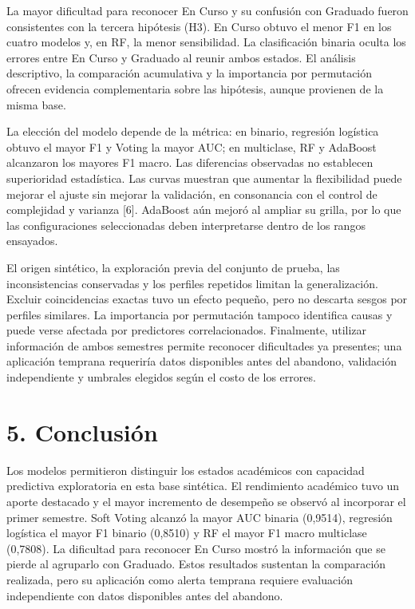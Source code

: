 \documentclass[10pt,a4paper]{article}
\begin{document}
La mayor dificultad para reconocer En Curso y su confusión con Graduado fueron consistentes con la tercera hipótesis (H3). En Curso obtuvo el menor F1
en los cuatro modelos y, en RF, la menor sensibilidad. La clasificación binaria oculta los errores entre En Curso y Graduado al reunir ambos estados.
El análisis descriptivo, la comparación acumulativa y la importancia por permutación ofrecen evidencia complementaria sobre las hipótesis, aunque
provienen de la misma base.

La elección del modelo depende de la métrica: en binario, regresión logística obtuvo el mayor F1 y Voting la mayor AUC; en multiclase, RF y AdaBoost
alcanzaron los mayores F1 macro. Las diferencias observadas no establecen superioridad estadística. Las curvas muestran que aumentar la flexibilidad
puede mejorar el ajuste sin mejorar la validación, en consonancia con el control de complejidad y varianza {[}6{]}. AdaBoost aún mejoró al ampliar su
grilla, por lo que las configuraciones seleccionadas deben interpretarse dentro de los rangos ensayados.

El origen sintético, la exploración previa del conjunto de prueba, las inconsistencias conservadas y los perfiles repetidos limitan la generalización.
Excluir coincidencias exactas tuvo un efecto pequeño, pero no descarta sesgos por perfiles similares. La importancia por permutación tampoco
identifica causas y puede verse afectada por predictores correlacionados. Finalmente, utilizar información de ambos semestres permite reconocer
dificultades ya presentes; una aplicación temprana requeriría datos disponibles antes del abandono, validación independiente y umbrales elegidos según
el costo de los errores.

\hypertarget{conclusiuxf3n}{%
\section{5. Conclusión}\label{conclusiuxf3n}}

Los modelos permitieron distinguir los estados académicos con capacidad predictiva exploratoria en esta base sintética. El rendimiento académico tuvo
un aporte destacado y el mayor incremento de desempeño se observó al incorporar el primer semestre. Soft Voting alcanzó la mayor AUC binaria (0,9514),
regresión logística el mayor F1 binario (0,8510) y RF el mayor F1 macro multiclase (0,7808). La dificultad para reconocer En Curso mostró la
información que se pierde al agruparlo con Graduado. Estos resultados sustentan la comparación realizada, pero su aplicación como alerta temprana
requiere evaluación independiente con datos disponibles antes del abandono.
\end{document}
